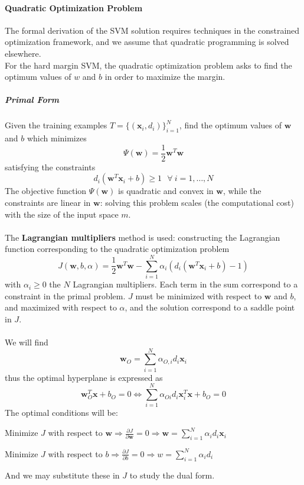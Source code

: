 \documentclass[10pt]{report}
\begin{document}
\paragraph{Quadratic Optimization Problem} The formal derivation of the SVM solution requires techniques in the constrained optimization framework, and we assume that quadratic programming is solved elsewhere.\\
For the hard margin SVM, the quadratic optimization problem asks to find the optimum values of $w$ and $b$ in order to maximize the margin.
\subparagraph{Primal Form} Given the training examples $T = \{(\mathbf{x}_i, d_i)\}_{i=1}^N$, find the optimum values of $\mathbf{w}$ and $b$ which minimizes $$\Psi(\mathbf{w}) = \frac{1}{2}\mathbf{w}^T\mathbf{w}$$ satisfying the constraints $$d_i(\mathbf{w}^T\mathbf{x}_i+b)\geq 1\:\:\:\forall\:i=1,\ldots,N$$
The objective function $\Psi(\mathbf{w})$ is quadratic and convex in $\mathbf{w}$, while the constraints are linear in $\mathbf{w}$: solving this problem scales (the computational cost) with the size of the input space $m$.\\\\
The \textbf{Lagrangian multipliers} method is used: constructing the Lagrangian function corresponding to the quadratic optimization problem $$J(\mathbf{w}, b,\alpha) = \frac{1}{2} \mathbf{w}^T\mathbf{w} - \sum_{i=1}^N\alpha_i\left(d_i\left(\mathbf{w}^T\mathbf{x}_i+b\right)-1\right)$$ with $\alpha_i \geq 0$ the $N$ Lagrangian multipliers. Each term in the sum correspond to a constraint in the primal problem. $J$ must be minimized with respect to $\mathbf{w}$ and $b$, and maximized with respect to $\alpha$, and the solution correspond to a saddle point in $J$.\\\\
We will find $$\mathbf{w}_O = \sum_{i=1}^N \alpha_{O,i}d_i\mathbf{x}_i$$ thus the optimal hyperplane is expressed as $$\mathbf{w}^T_O\mathbf{x}+b_O = 0 \Leftrightarrow \sum_{i=1}^N\alpha_{Oi}d_i\mathbf{x}_i^T\mathbf{x} + b_O = 0$$
The optimal conditions will be:
\begin{list}{}{}
	\item Minimize $J$ with respect to $\mathbf{w} \Rightarrow\frac{\partial J}{\partial \mathbf{w}} = 0 \Rightarrow \mathbf{w} = \sum_{i=1}^N \alpha_id_i\mathbf{x}_i$
	\item Minimize $J$ with respect to $b \Rightarrow\frac{\partial J}{\partial b} = 0 \Rightarrow w = \sum_{i=1}^N \alpha_id_i$
\end{list}
And we may substitute these in $J$ to study the dual form.
\end{document}
